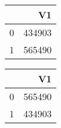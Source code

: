 \bigskip\bigskip
\centering
\begin{tabular}{rr}
  \hline
 & V1 \\ 
  \hline
0 & 434903 \\ 
  1 & 565490 \\ 
   \hline
\end{tabular}

\bigskip\bigskip
\centering
\begin{tabular}{rr}
  \hline
 & V1 \\ 
  \hline
0 & 565490 \\ 
  1 & 434903 \\ 
   \hline
\end{tabular}

